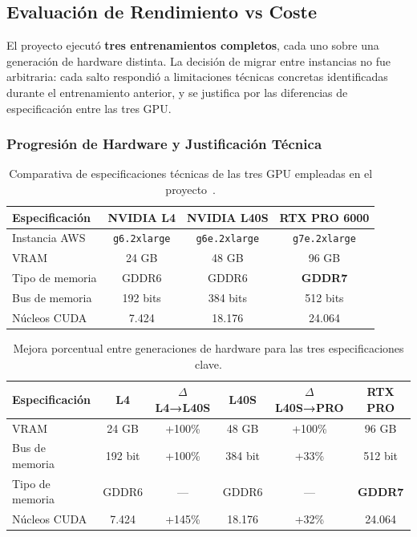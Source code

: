 \subsection{Evaluación de Rendimiento vs Coste}

El proyecto ejecutó \textbf{tres entrenamientos completos}, cada uno sobre una generación de hardware distinta. La decisión de migrar entre instancias no fue arbitraria: cada salto respondió a limitaciones técnicas concretas identificadas durante el entrenamiento anterior, y se justifica por las diferencias de especificación entre las tres GPU.

\subsubsection{Progresión de Hardware y Justificación Técnica}

\begin{table}[H]
\centering
\begin{tabularx}{\textwidth}{|X|c|c|c|}
\hline
\textbf{Especificación} & \textbf{NVIDIA L4} & \textbf{NVIDIA L40S} & \textbf{RTX PRO 6000} \\ \hline
Instancia AWS & \texttt{g6.2xlarge} & \texttt{g6e.2xlarge} & \texttt{g7e.2xlarge} \\ \hline
VRAM & 24 GB & 48 GB & 96 GB \\ \hline
Tipo de memoria & GDDR6 & GDDR6 & \textbf{GDDR7} \\ \hline
Bus de memoria & 192 bits & 384 bits & 512 bits \\ \hline
Núcleos CUDA & 7.424 & 18.176 & 24.064 \\ \hline
\end{tabularx}
\caption{Comparativa de especificaciones técnicas de las tres GPU empleadas en el proyecto~\cite{techpowerup2024l4,techpowerup2024l40s,techpowerup2025rtxpro6000}.}
\label{tab:gpu_specs}
\end{table}

\begin{table}[H]
\centering
\begin{tabularx}{\textwidth}{|X|c|c|c|c|c|}
\hline
\textbf{Especificación} & \textbf{L4} & \textbf{$\Delta$ L4→L40S} & \textbf{L40S} & \textbf{$\Delta$ L40S→PRO} & \textbf{RTX PRO} \\ \hline
VRAM             & 24 GB   & +100\%  & 48 GB   & +100\% & 96 GB   \\ \hline
Bus de memoria   & 192 bit & +100\%  & 384 bit & +33\%  & 512 bit \\ \hline
Tipo de memoria  & GDDR6   & ---     & GDDR6   & ---    & \textbf{GDDR7}   \\ \hline
Núcleos CUDA     & 7.424   & +145\%  & 18.176  & +32\%  & 24.064  \\ \hline
\end{tabularx}
\caption{Mejora porcentual entre generaciones de hardware para las tres especificaciones clave.}
\label{tab:gpu_delta}
\end{table}

